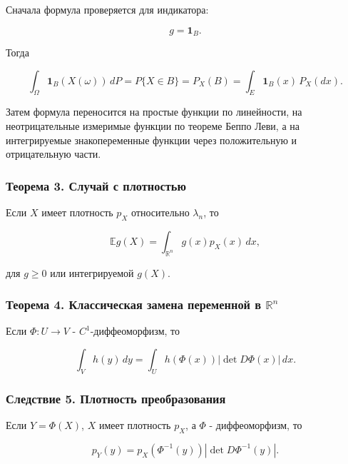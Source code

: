 \documentclass[
  11pt,
  a4paper,
]{article}
\begin{document}
Сначала формула проверяется для индикатора:

\[
g=\mathbf 1_B.
\]

Тогда

\[
\int_\Omega \mathbf 1_B(X(\omega))\,dP
=
P\{X\in B\}
=
P_X(B)
=
\int_E\mathbf 1_B(x)\,P_X(dx).
\]

Затем формула переносится на простые функции по линейности, на
неотрицательные измеримые функции по теореме Беппо Леви, а на
интегрируемые знакопеременные функции через положительную и
отрицательную части.

\subsubsection{Теорема 3. Случай с
плотностью}\label{ux442ux435ux43eux440ux435ux43cux430-3.-ux441ux43bux443ux447ux430ux439-ux441-ux43fux43bux43eux442ux43dux43eux441ux442ux44cux44e}

Если \(X\) имеет плотность \(p_X\) относительно \(\lambda_n\), то

\[
\mathbb E g(X)=\int_{\mathbb R^n}g(x)p_X(x)\,dx,
\]

для \(g\ge0\) или интегрируемой \(g(X)\).

\subsubsection{\texorpdfstring{Теорема 4. Классическая замена переменной
в
\(\mathbb R^n\)}{Теорема 4. Классическая замена переменной в \textbackslash mathbb R\^{}n}}\label{ux442ux435ux43eux440ux435ux43cux430-4.-ux43aux43bux430ux441ux441ux438ux447ux435ux441ux43aux430ux44f-ux437ux430ux43cux435ux43dux430-ux43fux435ux440ux435ux43cux435ux43dux43dux43eux439-ux432-mathbb-rn}

Если \(\Phi:U\to V\) - \(C^1\)-диффеоморфизм, то

\[
\int_V h(y)\,dy
=
\int_U h(\Phi(x))|\det D\Phi(x)|\,dx.
\]

\subsubsection{Следствие 5. Плотность
преобразования}\label{ux441ux43bux435ux434ux441ux442ux432ux438ux435-5.-ux43fux43bux43eux442ux43dux43eux441ux442ux44c-ux43fux440ux435ux43eux431ux440ux430ux437ux43eux432ux430ux43dux438ux44f}

Если \(Y=\Phi(X)\), \(X\) имеет плотность \(p_X\), а \(\Phi\) -
диффеоморфизм, то

\[
p_Y(y)=p_X(\Phi^{-1}(y))
\left|\det D\Phi^{-1}(y)\right|.
\]
\end{document}
